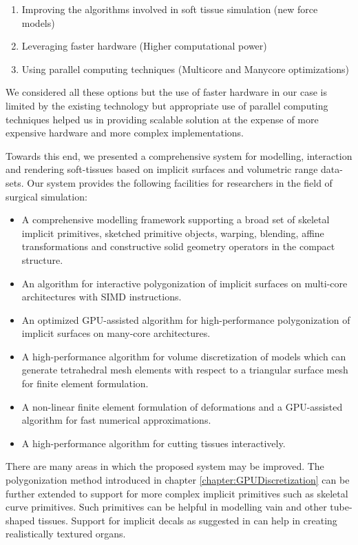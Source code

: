\begin{enumerate}
 \item Improving the algorithms involved in soft tissue simulation (new force models)
 \item Leveraging faster hardware (Higher computational power)
 \item Using parallel computing techniques (Multicore and Manycore optimizations)
\end{enumerate}

We considered all these options but the use of faster hardware in our case is limited by the existing technology but appropriate 
use of parallel computing techniques helped us in providing scalable solution at the expense of more expensive hardware and more 
complex implementations.

Towards this end, we presented a comprehensive system for modelling, interaction and rendering soft-tissues based on implicit surfaces and volumetric range data-sets.
Our system provides the following facilities for researchers in the field of surgical simulation:

\begin{itemize}
 \item A comprehensive modelling framework supporting a broad set of skeletal implicit primitives, sketched primitive objects, warping, blending, 
 affine transformations and constructive solid geometry operators in the compact \blob structure.
 \item An algorithm for interactive polygonization of implicit surfaces on multi-core architectures with SIMD instructions.
 \item An optimized GPU-assisted algorithm for high-performance polygonization of implicit surfaces on many-core architectures.
 \item A high-performance algorithm for volume discretization of \blob models which can generate tetrahedral mesh elements with respect to a triangular 
 surface mesh for finite element formulation.
 \item A non-linear finite element formulation of deformations and a GPU-assisted algorithm for fast numerical approximations.
 \item A high-performance algorithm for cutting tissues interactively. 
\end{itemize}

There are many areas in which the proposed system may be improved. The polygonization method introduced in chapter \ref{chapter:GPUDiscretization} can be further 
extended to support for more complex implicit primitives such as skeletal curve primitives. Such primitives can be helpful in modelling vain and other tube-shaped
tissues. Support for implicit decals as suggested in \cite{Schmidtb} can help in creating realistically textured organs. 

